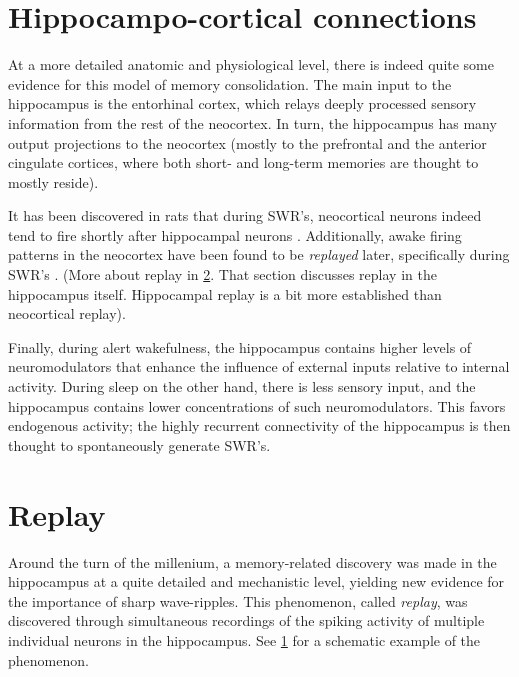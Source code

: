 \section{Hippocampo-cortical connections}
\label{sec:HC-neocortex}

At a more detailed anatomic and physiological level, there is indeed quite some evidence for this model of memory consolidation. The main input to the hippocampus is the entorhinal cortex, which relays deeply processed sensory information from the rest of the neocortex. In turn, the hippocampus has many output projections to the neocortex (mostly to the prefrontal and the anterior cingulate cortices, where both short- and long-term memories are thought to mostly reside).

It has been discovered in rats that during SWR's, neocortical neurons indeed tend to fire shortly after hippocampal neurons \cite{Wierzynski2009}. Additionally, awake firing patterns in the neocortex have been found to be \emph{replayed} later, specifically during SWR's \cite{Peyrache2009}. (More about replay in \cref{sec:replay}. That section discusses replay in the hippocampus itself. Hippocampal replay is a bit more established than neocortical replay).

Finally, during alert wakefulness, the hippocampus contains higher levels of neuromodulators that enhance the influence of external inputs relative to internal activity. During sleep on the other hand, there is less sensory input, and the hippocampus contains lower concentrations of such neuromodulators. This favors endogenous activity; the highly recurrent connectivity of the hippocampus is then thought to spontaneously generate SWR's.




\begin{figure}
\label{fig:replay}
\end{figure}

\section{Replay}
\label{sec:replay}

Around the turn of the millenium, a memory-related discovery was made in the hippocampus at a quite detailed and mechanistic level, yielding new evidence for the importance of sharp wave-ripples. This phenomenon, called \emph{replay}, was discovered through simultaneous recordings of the spiking activity of multiple individual neurons in the hippocampus.\footnotemark{} See \cref{fig:replay} for a schematic example of the phenomenon.


